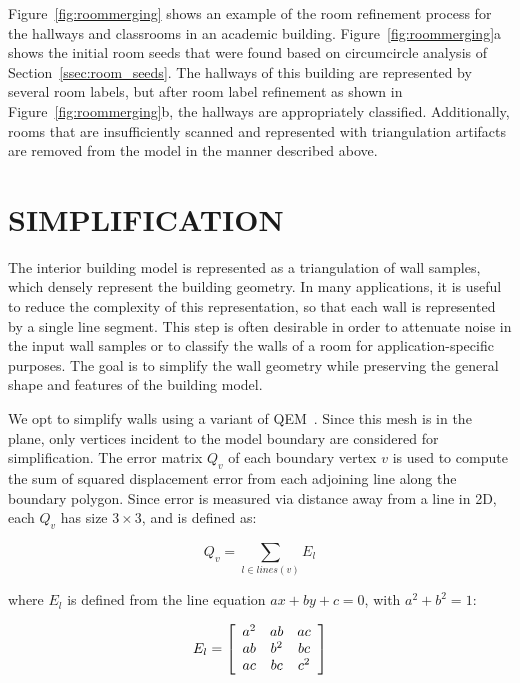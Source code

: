 \documentclass[a4paper,twoside]{article}
\begin{document}
Figure~\ref{fig:roommerging} shows an example of the room refinement process for the hallways and classrooms in an academic building. Figure~\ref{fig:roommerging}a shows the initial room seeds that were found based on circumcircle analysis of Section~\ref{ssec:room_seeds}.  The hallways of this building are represented by several room labels, but after room label refinement as shown in Figure~\ref{fig:roommerging}b, the hallways are appropriately classified.  Additionally, rooms that are insufficiently scanned and represented with triangulation artifacts are removed from the model in the manner described above.

\section{\uppercase{Simplification}}
\label{sec:simplification}

\noindent The interior building model is represented as a triangulation of wall samples, which densely represent the building geometry.  In many applications, it is useful to reduce the complexity of this representation, so that each wall is represented by a single line segment.  This step is often desirable in order to attenuate noise in the input wall samples or to classify the walls of a room for application-specific purposes.  The goal is to simplify the wall geometry while preserving the general shape and features of the building model.

We opt to simplify walls using a variant of QEM~\cite{QEM}.  Since this mesh is in the plane, only vertices incident to the model boundary are considered for simplification.  The error matrix $Q_v$ of each boundary vertex $v$ is used to compute the sum of squared displacement error from each adjoining line along the boundary polygon.  Since error is measured via distance away from a line in 2D, each $Q_v$ has size $3 \times 3$, and is defined as:

\begin{equation}
Q_v = \sum_{l \in lines(v)} E_l
\end{equation}

where $E_l$ is defined from the line equation $ax + by + c = 0$, with $a^2 + b^2 = 1$:

\begin{equation}
E_l = \left[ \begin{array}{c c c}
a^2 & ab & ac \\
ab & b^2 & bc \\
ac & bc & c^2 \end{array} \right]
\end{equation}
\end{document}
